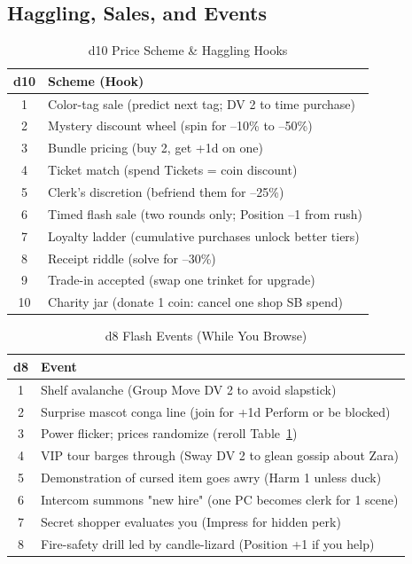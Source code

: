 \subsection{Haggling, Sales, and Events}

\begin{table}[h]
\centering
\caption{d10 Price Scheme \& Haggling Hooks}
\label{tab:price-scheme}
\begin{tabular}{@{}cl@{}}
\toprule
d10 & Scheme (Hook) \\
\midrule
1 & Color-tag sale (predict next tag; DV 2 to time purchase) \\
2 & Mystery discount wheel (spin for --10\% to --50\%) \\
3 & Bundle pricing (buy 2, get +1d on one) \\
4 & Ticket match (spend Tickets = coin discount) \\
5 & Clerk's discretion (befriend them for --25\%) \\
6 & Timed flash sale (two rounds only; Position --1 from rush) \\
7 & Loyalty ladder (cumulative purchases unlock better tiers) \\
8 & Receipt riddle (solve for --30\%) \\
9 & Trade-in accepted (swap one trinket for upgrade) \\
10 & Charity jar (donate 1 coin: cancel one shop SB spend) \\
\bottomrule
\end{tabular}
\end{table}

\begin{table}[h]
\centering
\caption{d8 Flash Events (While You Browse)}
\label{tab:flash-events}
\begin{tabular}{@{}cl@{}}
\toprule
d8 & Event \\
\midrule
1 & Shelf avalanche (Group Move DV 2 to avoid slapstick) \\
2 & Surprise mascot conga line (join for +1d Perform or be blocked) \\
3 & Power flicker; prices randomize (reroll Table~\ref{tab:price-scheme}) \\
4 & VIP tour barges through (Sway DV 2 to glean gossip about Zara) \\
5 & Demonstration of cursed item goes awry (Harm 1 unless duck) \\
6 & Intercom summons "new hire" (one PC becomes clerk for 1 scene) \\
7 & Secret shopper evaluates you (Impress for hidden perk) \\
8 & Fire-safety drill led by candle-lizard (Position +1 if you help) \\
\bottomrule
\end{tabular}
\end{table}

